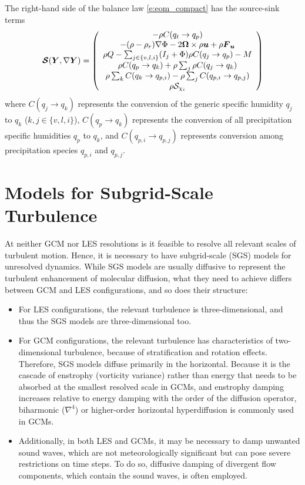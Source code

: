 \documentclass{report}
\begin{document}
The right-hand side of the balance law \eqref{e:eom_compact} has the source-sink terms
\begin{equation}
\Source(\vec{Y}, \grad\vec{Y})= 
 \left( \begin{array}{c}
 -\rho C(q_t \rightarrow q_p) \\
  -(\rho - \rho_r) \grad\Phi - 2 \vec{\Omega} \times \rho\vec{u}  + \rho \vec{F}_{\vec{u}} \\
 \rho Q - \sum_{j\in\{v,l,i\}} (I_j + \Phi)  \rho C(q_j \rightarrow q_p) - M \\%
\rho C(q_p \rightarrow q_k) + \rho \sum_j \rho C(q_j \rightarrow q_k) \\
    \rho \sum_k C(q_k \rightarrow q_{p, i}) - \rho \sum_j C(q_{p, i} \rightarrow q_{p, j})\\
\rho \mathcal{S}_{\chi_i}
\end{array}
\right)
\label{eq:source}
\end{equation}
where $C(q_j \rightarrow q_k)$ represents the conversion of the generic specific humidity $q_j$ to $q_k$ ($k, j \in \{v, l, i\}$), $C(q_p \rightarrow q_k)$ represents the conversion of all precipitation specific humidities $q_p$ to $q_k$, and $C(q_{p, i} \rightarrow q_{p, j})$ represents conversion among precipitation species $q_{p, i}$ and $q_{p, j}$. 

\chapter{Models for Subgrid-Scale Turbulence}\label{c:sgs_models}

At neither GCM nor LES resolutions is it feasible to resolve all relevant scales of turbulent motion. Hence, it is necessary to have subgrid-scale (SGS) models for unresolved dynamics. While SGS models are usually diffusive to represent the turbulent enhancement of molecular diffusion,  what they need to achieve differs between GCM and LES configurations, and so does their structure:
\begin{itemize}
    \item For LES configurations, the relevant turbulence is three-dimensional, and thus the SGS models are three-dimensional too. 
    \item For GCM configurations, the relevant turbulence has characteristics of two-dim\-ensio\-nal turbulence, because of stratification and rotation effects. Therefore, SGS models diffuse primarily in the horizontal. Because it is the cascade of enstrophy (vorticity variance) rather than energy that needs to be absorbed at the smallest resolved scale in GCMs, and enstrophy damping increases relative to energy damping with the order of the diffusion operator, biharmonic ($\nabla^4$) or higher-order horizontal hyperdiffusion is commonly used in GCMs. 
    \item Additionally, in both LES and GCMs, it may be necessary to damp unwanted sound waves, which are not meteorologically significant but can pose severe restrictions on time steps. To do so, diffusive damping of divergent flow components, which contain the sound waves, is often employed. 
\end{itemize}
\end{document}
